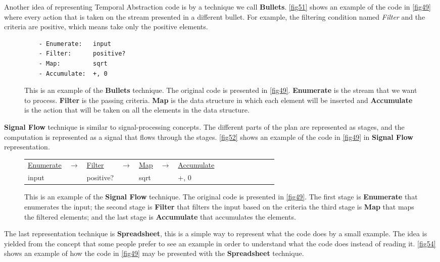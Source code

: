 Another idea of representing Temporal Abstraction code is by a technique we call \textbf{Bullets}. \autoref{fig51} shows an example of the code in \autoref{fig49} where every action that is taken on the stream presented in a different bullet. For example, the filtering condition named \textit{Filter} and the criteria are positive, which means take only the positive elements.
\begin{figure}[H]
	\begin{lstlisting}
	- Enumerate:   input
	- Filter:      positive?
	- Map:         sqrt
	- Accumulate:  +, 0
	\end{lstlisting}
	\caption{This is an example of the \textbf{Bullets} technique. The original code is presented in \autoref{fig49}. \textbf{Enumerate} is the stream that we want to process. \textbf{Filter} is the passing criteria. \textbf{Map} is the data structure in which each element will be inserted and \textbf{Accumulate} is the action that will be taken on all the elements in the data structure.}
	\label{fig51}
\end{figure}
\textbf{Signal Flow} technique is similar to signal-processing concepts. The different parts of the plan are represented as stages, and the computation is represented as a signal that flows through the stages. \autoref{fig52} shows an example of the code in \autoref{fig49} in \textbf{Signal Flow} representation.
\begin{figure}[H]
	\begin{table}[H]
		\centering
		\begin{tabular}{l p{2cm}l p{0.3cm}l p{1.5cm}l p{0.3cm}l p{1cm}l p{0.3cm}l p{1cm} l}
			\underline{Enumerate} & $ \rightarrow $ & \underline{Filter} & $ \rightarrow $ & \underline{Map}  & $ \rightarrow $ & \underline{Accumulate} \\
			input & & positive? & & sqrt & & +, 0
		\end{tabular}
	\end{table}
	\caption{This is an example of the \textbf{Signal Flow} technique. The original code is presented in \autoref{fig49}. The first stage is \textbf{Enumerate} that enumerates the input; the second stage is \textbf{Filter} that filters the input based on the criteria\; the third stage is \textbf{Map} that maps the filtered elements; and the last stage is \textbf{Accumulate} that accumulates the elements.}
	\label{fig52}
\end{figure}
The last representation technique is \textbf{Spreadsheet}, this is a simple way to represent what the code does by a small example. The idea is yielded from the concept that some people prefer to see an example in order to understand what the code does instead of reading it. \autoref{fig54} shows an example of how the code in \autoref{fig49} may be presented with the \textbf{Spreadsheet} technique.
